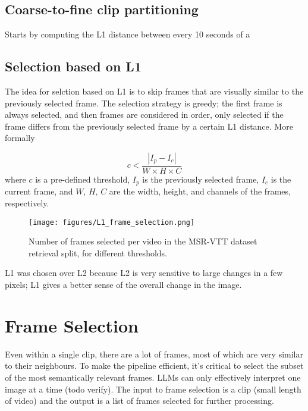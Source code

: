\documentclass{article}
\begin{document}
\subsection{Coarse-to-fine clip partitioning}
Starts by computing the L1 distance between every 10 seconds of a 

\subsection{Selection based on L1}
The idea for selction based on L1 is to skip frames that are visually similar to the previously selected frame.
The selection strategy is greedy; the first frame is always selected, and then frames are considered in order, only selected if the frame differs from the previously selected frame by a certain L1 distance.
More formally

\begin{equation}
      c < \frac{|I_{p} - I_{c}|}{W \times H \times C}
\end{equation}
where $c$ is a pre-defined threshold, $I_{p}$ is the previously selected frame, $I_{c}$ is the current frame, and $W$, $H$, $C$ are the width, height, and channels of the frames, respectively.

\begin{figure}
      \centering
      \texttt{[image: figures/L1\_frame\_selection.png]}
      \caption{Number of frames selected per video in the MSR-VTT dataset retrieval split, for different thresholds.}
      \label{fig:optical_flow}
\end{figure}

L1 was chosen over L2 because L2 is very sensitive to large changes in a few pixels; L1 gives a better sense of the overall change in the image.


\section{Frame Selection}

Even within a single clip, there are a lot of frames, most of which are very similar to their neighbours.
To make the pipeline efficient, it's critical to select the subset of the most semantically relevant frames.
LLMs can only effectively interpret one image at a time (todo verify).
The input to frame selection is a clip (small length of video) and the output is a list of frames selected for further processing.
\end{document}

